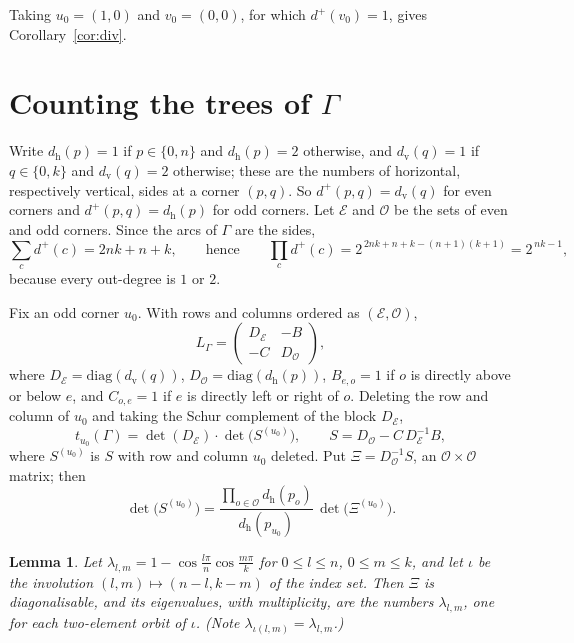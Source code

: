 \documentclass[11pt,a4paper]{amsart}
\newtheorem{lemma}[theorem]{Lemma}
\theoremstyle{remark}
\newcommand{\G}{\Gamma}
\newcommand{\dout}{d^{+}}
\newcommand{\dvv}{d_{\mathrm v}}
\newcommand{\dhh}{d_{\mathrm h}}
\begin{document}
Taking $u_0=(1,0)$ and $v_0=(0,0)$, for which $\dout(v_0)=1$, gives Corollary~\ref{cor:div}.

\section{Counting the trees of $\G$}\label{sec:eval}

Write $\dhh(p)=1$ if $p\in\{0,n\}$ and $\dhh(p)=2$ otherwise, and $\dvv(q)=1$ if $q\in\{0,k\}$ and $\dvv(q)=2$
otherwise; these are the numbers of horizontal, respectively vertical, sides at a corner $(p,q)$. So
$\dout(p,q)=\dvv(q)$ for even corners and $\dout(p,q)=\dhh(p)$ for odd corners. Let $\mathcal E$ and $\mathcal O$
be the sets of even and odd corners. Since the arcs of $\G$ are the sides,
\begin{equation}\label{eq:outprod}
\sum_c\dout(c)=2nk+n+k,\qquad\text{hence}\qquad \prod_c\dout(c)=2^{\,2nk+n+k-(n+1)(k+1)}=2^{\,nk-1},
\end{equation}
because every out-degree is $1$ or $2$.

Fix an odd corner $u_0$. With rows and columns ordered as $(\mathcal E,\mathcal O)$,
\[ L_{\G}=\begin{pmatrix} D_{\mathcal E} & -B\\ -C & D_{\mathcal O}\end{pmatrix}, \]
where $D_{\mathcal E}=\mathrm{diag}(\dvv(q))$, $D_{\mathcal O}=\mathrm{diag}(\dhh(p))$, $B_{e,o}=1$ if $o$ is
directly above or below $e$, and $C_{o,e}=1$ if $e$ is directly left or right of $o$. Deleting the row and
column of $u_0$ and taking the Schur complement of the block $D_{\mathcal E}$,
\begin{equation}\label{eq:schur}
t_{u_0}(\G)=\det(D_{\mathcal E})\cdot\det\bigl(S^{(u_0)}\bigr),\qquad S=D_{\mathcal O}-C\,D_{\mathcal E}^{-1}B,
\end{equation}
where $S^{(u_0)}$ is $S$ with row and column $u_0$ deleted. Put $\Xi=D_{\mathcal O}^{-1}S$, an
$\mathcal O\times\mathcal O$ matrix; then
\begin{equation}\label{eq:xi}
\det\bigl(S^{(u_0)}\bigr)=\frac{\prod_{o\in\mathcal O}\dhh(p_o)}{\dhh(p_{u_0})}\,\det\bigl(\Xi^{(u_0)}\bigr).
\end{equation}

\begin{lemma}\label{lem:spec}
Let $\lambda_{l,m}=1-\cos\frac{l\pi}{n}\cos\frac{m\pi}{k}$ for $0\le l\le n$, $0\le m\le k$, and let $\iota$ be
the involution $(l,m)\mapsto(n-l,k-m)$ of the index set. Then $\Xi$ is diagonalisable, and its eigenvalues, with
multiplicity, are the numbers $\lambda_{l,m}$, one for each two-element orbit of $\iota$.
\textup{(}Note $\lambda_{\iota(l,m)}=\lambda_{l,m}$.\textup{)}
\end{lemma}
\end{document}
